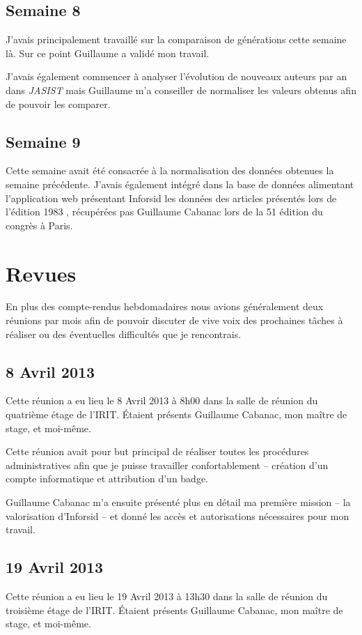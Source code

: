 	
	\subsection{Semaine 8}\label{ch:CRH8}
		J'avais principalement travaillé sur la comparaison de générations cette semaine là. Sur ce point Guillaume a validé mon travail.
		
		J'avais également commencer à analyser l'évolution de nouveaux auteurs par an dans \textit{JASIST} mais Guillaume m'a conseiller de normaliser les valeurs obtenus afin de pouvoir les comparer.
	
	
	\subsection{Semaine 9}
		Cette semaine avait été consacrée à la normalisation des données obtenues la semaine précédente. J'avais également intégré dans la base de données alimentant l'application web présentant Inforsid les données des articles présentés lors de l'édition 1983 , récupérées pas Guillaume Cabanac lors de la 51 édition du congrès à Paris.


\section{Revues}
	En plus des compte-rendus hebdomadaires nous avions généralement deux réunions par mois afin de pouvoir discuter de vive voix des prochaines tâches à réaliser ou des éventuelles difficultés que je rencontrais.
	
	
	\subsection{8 Avril 2013}
		Cette réunion a eu lieu le 8 Avril 2013 à 8h00 dans la salle de réunion du quatrième étage de l'IRIT. Étaient présents Guillaume Cabanac, mon maître de stage, et moi-même.
		
		Cette réunion avait pour but principal de réaliser toutes les procédures administratives afin que je puisse travailler confortablement -- création d'un compte informatique et attribution d'un badge.
		
		Guillaume Cabanac m'a ensuite présenté plus en détail ma première mission -- la valorisation d'Inforsid -- et donné les accès et autorisations nécessaires pour mon travail.
	
	
	\subsection{19 Avril 2013}
		Cette réunion a eu lieu le 19 Avril 2013 à 13h30 dans la salle de réunion du troisième étage de l'IRIT. Étaient présents Guillaume Cabanac, mon maître de stage, et moi-même.
		
